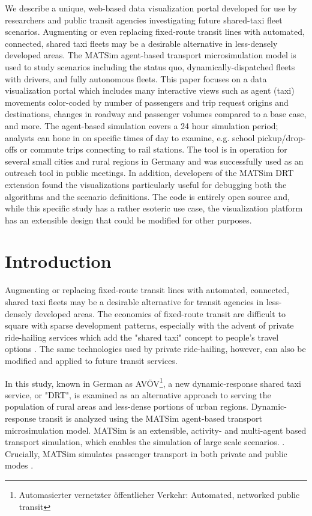 We describe a unique, web-based data visualization portal developed for use by researchers and public transit agencies investigating future shared-taxi fleet scenarios. Augmenting or even replacing fixed-route transit lines with automated, connected, shared taxi fleets may be a desirable alternative in less-densely developed areas. The MATSim agent-based transport microsimulation model is used to study scenarios including the status quo, dynamically-dispatched fleets with drivers, and fully autonomous fleets. This paper focuses on a data visualization portal which includes many interactive views such as agent (taxi) movements color-coded by number of passengers and trip request origins and destinations, changes in roadway and passenger volumes compared to a base case, and more. The agent-based simulation covers a 24 hour simulation period; analysts can hone in on specific times of day to examine, e.g. school pickup/drop-offs or commute trips connecting to rail stations. The tool is in operation for several small cities and rural regions in Germany and was successfully used as an outreach tool in public meetings. In addition, developers of the MATSim DRT extension found the visualizations particularly useful for debugging both the algorithms and the scenario definitions. The code is entirely open source and, while this specific study has a rather esoteric use case, the visualization platform has an extensible design that could be modified for other purposes.

\section{Introduction}
\label{introduction}

Augmenting or replacing fixed-route transit lines with automated, connected, shared taxi fleets may be a desirable alternative for transit agencies in less-densely developed areas. The economics of fixed-route transit are difficult to square with sparse development patterns, especially with the advent of private ride-hailing services which add the "shared taxi" concept to people's travel options \cite{Hough2018}. The same technologies used by private ride-hailing, however, can also be modified and applied to future transit services.

In this study, known in German as AVÖV\footnote{Automasierter vernetzter öffentlicher Verkehr: Automated, networked public transit}, a new dynamic-response shared taxi service, or "DRT", is examined as an alternative approach to serving the population of rural areas and less-dense portions of urban regions. Dynamic-response transit is analyzed using the MATSim agent-based transport microsimulation model. MATSim is an extensible, activity- and multi-agent based transport simulation, which enables the simulation of large scale scenarios. \cite{MATSimBook}. Crucially, MATSim simulates passenger transport in both private and public modes \cite{ZiemkeEtAl2019OpenBerlinScenario}.


